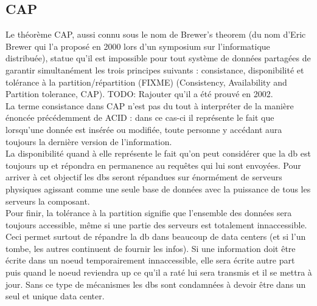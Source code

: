 \documentclass[11pt]{article}
\begin{document}
\subsection{CAP}
Le théorème CAP, aussi connu sous le nom de Brewer's theorem (du nom d'Eric Brewer qui l'a proposé en 2000 lors d'un symposium sur l'informatique distribuée), statue qu'il est impossible pour tout système de données partagées de garantir simultanément les trois principes suivants : consistance, disponibilité et tolérance à la partition/répartition (FIXME) (Consistency, Availability and Partition tolerance, CAP). TODO: Rajouter qu'il a été prouvé en 2002. \\
La terme consistance dans CAP n'est pas du tout à interpréter de la manière énoncée précédemment de ACID : dans ce cas-ci il représente le fait que lorsqu'une donnée est insérée ou modifiée, toute personne y accédant aura toujours la dernière version de l'information. \\
La disponibilité quand à elle représente le fait qu'on peut considérer que la db est toujours up et répondra en permanence au requêtes qui lui sont envoyées. Pour arriver à cet objectif les dbs seront répandues sur énormément de serveurs physiques agissant comme une seule base de données avec la puissance de tous les serveurs la composant. \\
Pour finir, la tolérance à la partition signifie que l'ensemble des données sera toujours accessible, même si une partie des serveurs est totalement innaccessible. Ceci permet surtout de répandre la db dans beaucoup de data centers (et si l'un tombe, les autres continuent de fournir les infos). Si une information doit être écrite dans un noeud temporairement innaccessible, elle sera écrite autre part puis quand le noeud reviendra up ce qu'il a raté lui sera transmis et il se mettra à jour. Sans ce type de mécanismes les dbs sont condamnées à devoir être dans un seul et unique data center. 
\end{document}
